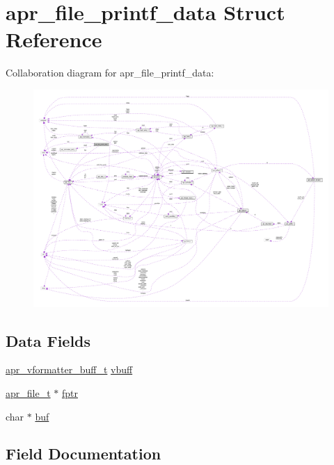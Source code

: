\hypertarget{structapr__file__printf__data}{}\section{apr\+\_\+file\+\_\+printf\+\_\+data Struct Reference}
\label{structapr__file__printf__data}


Collaboration diagram for apr\+\_\+file\+\_\+printf\+\_\+data\+:
\nopagebreak
\begin{figure}[H]
\begin{center}
\leavevmode
\includegraphics[width=350pt]{structapr__file__printf__data__coll__graph}
\end{center}
\end{figure}
\subsection*{Data Fields}
\begin{DoxyCompactItemize}
\item 
\hyperlink{structapr__vformatter__buff__t}{apr\+\_\+vformatter\+\_\+buff\+\_\+t} \hyperlink{structapr__file__printf__data_a0e59269a08b5a60bb10bfd0c0dec0ffc}{vbuff}
\item 
\hyperlink{structapr__file__t}{apr\+\_\+file\+\_\+t} $\ast$ \hyperlink{structapr__file__printf__data_a6c7bcfc5ccbc0b9bf4c5890906b254f6}{fptr}
\item 
char $\ast$ \hyperlink{structapr__file__printf__data_a6c9af2584611f87c25c0ed59dd6f53e0}{buf}
\end{DoxyCompactItemize}


\subsection{Field Documentation}
